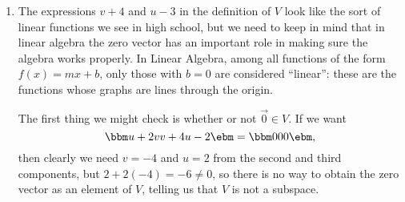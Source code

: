 {\begin{enumerate}
\item The expressions $v+4$ and $u-3$ in the definition of $V$ look like the sort of linear functions we see in high school, but we need to keep in mind that in linear algebra the zero vector has an important role in making sure the algebra works properly. In Linear Algebra, among all functions of the form $f(x)=mx+b$, only those with $b=0$ are considered ``linear'': these are the functions whose graphs are lines through the origin.

The first thing we might check is whether or not $\vec 0 \in V$. If we want
\[
\bbm u+2v\\v+4\\u-2\ebm = \bbm 0\\0\\0\ebm,
\]
then clearly we need $v=-4$ and $u=2$ from the second and third components, but $2+2(-4) = -6\neq 0$, so there is no way to obtain the zero vector as an element of $V$, telling us that $V$ is not a subspace.


\end{enumerate}}
